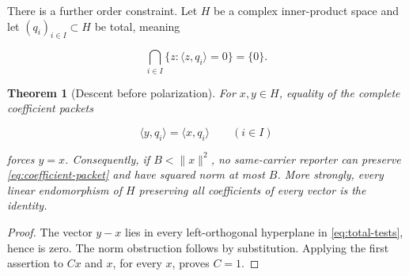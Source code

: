 \documentclass[11pt]{article}
\newtheorem{theorem}{Theorem}[section]
\theoremstyle{definition}
\theoremstyle{remark}
\begin{document}
There is a further order constraint.  Let \(H\) be a complex inner-product
space and let \((q_i)_{i\in I}\subset H\) be total, meaning

\[
 \bigcap_{i\in I}\{z:\langle z,q_i\rangle=0\}=\{0\}.
\tag{2.0i}\label{eq:total-tests}
\]

\begin{theorem}[Descent before polarization]
\label{thm:descent-before-polarization}
For \(x,y\in H\), equality of the complete coefficient packets

\[
             \langle y,q_i\rangle=\langle x,q_i\rangle
             \qquad(i\in I)
\tag{2.0j}\label{eq:coefficient-packet}
\]

forces \(y=x\).  Consequently, if \(B<\|x\|^2\), no same-carrier reporter
can preserve \eqref{eq:coefficient-packet} and have squared norm at most
\(B\).  More strongly, every linear endomorphism of \(H\) preserving all
coefficients of every vector is the identity.
\end{theorem}

\begin{proof}
The vector \(y-x\) lies in every left-orthogonal hyperplane in
\eqref{eq:total-tests}, hence is zero.  The norm obstruction follows by
substitution.  Applying the first assertion to \(Cx\) and \(x\), for every
\(x\), proves \(C=1\).
\end{proof}
\end{document}
